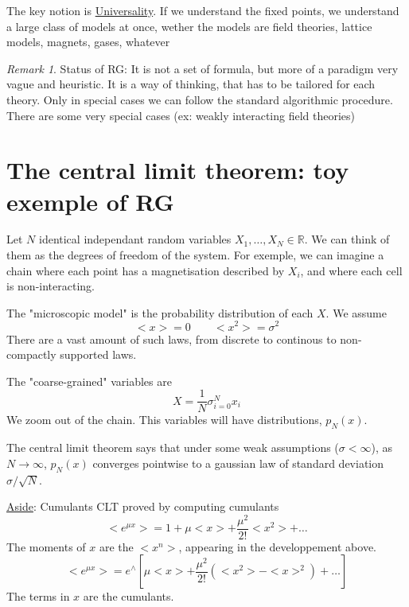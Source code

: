 \documentclass[a4paper]{book}
\theoremstyle{definition}
\theoremstyle{remark}
\newtheorem*{remark}{Remark}
\begin{document}
The key notion is \underline{Universality}. If we understand the fixed points, we understand a large class of models at once, wether the models are field theories, lattice models, magnets, gases, whatever \par

\begin{remark}
    Status of RG: It is not a set of formula, but more of a paradigm very vague and heuristic. It is a way of thinking, that has to be tailored for each theory. Only in special cases we can follow the standard algorithmic procedure. There are some very special cases (ex: weakly interacting field theories)
\end{remark}

\section{The central limit theorem: toy exemple of RG}

Let $N$ identical independant random variables $X_1, \dots, X_N \in \mathbb{R}$. We can think of them as the degrees of freedom of the system. For exemple, we can imagine a chain where each point has a magnetisation described by $X_i$, and where each cell is non-interacting. \par\medskip 

The "microscopic model" is the probability distribution of each $X$. We assume 
\begin{equation}
    <x> = 0 \qquad <x^2> = \sigma^2
\end{equation}
There are a vast amount of such laws, from discrete to continous to non-compactly supported laws. \par \medskip 

The "coarse-grained" variables are 
\begin{equation}
    X = \frac{1}{N}\sigma^N_{i = 0} x_i 
\end{equation}
We zoom out of the chain. This variables will have distributions, $p_N(x)$. \par \medskip 

The central limit theorem says that under some weak assumptions ($\sigma < \infty$), as $N \rightarrow \infty$, $p_N(x)$ converges pointwise to a gaussian law of standard deviation $\sigma / \sqrt{N}$. \par \bigskip 

\underline{Aside}: Cumulants \newline 
CLT proved by computing cumulants \newline 
\begin{equation}
    <e^{\mu x}> = 1 + \mu<x> + \frac{\mu^2}{2!}<x^2> + \dots
\end{equation}
The moments of $x$ are the $<x^n>$, appearing in the developpement above. 
\begin{equation}
    <e^{\mu x}> = e^\wedge[\mu <x> + \frac{\mu^2}{2!}(<x^2> - <x>^2) + \dots]
\end{equation}
The terms in $x$ are the cumulants. \bigskip 
\end{document}
